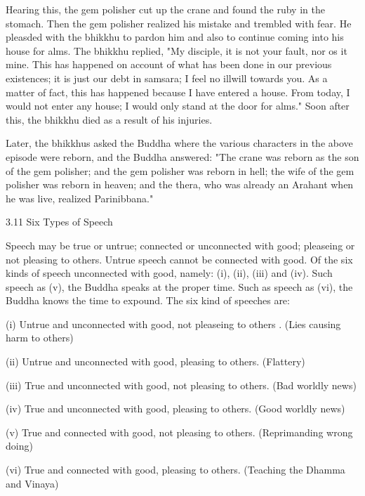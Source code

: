 Hearing this, the gem polisher cut up the crane and found the ruby in the stomach. Then the gem polisher realized his mistake and trembled with fear. He pleasded with the bhikkhu to pardon him and also to continue coming into his house for alms. The bhikkhu replied, "My disciple, it is not your fault, nor os it mine. This has happened on account of what has been done in our previous existences; it is just our debt in samsara; I feel no illwill towards you. As a matter of fact, this has happened because I have entered a house. From today, I would not enter any house; I would only stand at the door for alms." Soon after this, the bhikkhu died as a result of his injuries.

Later, the bhikkhus asked the Buddha where the various characters in the above episode were reborn, and the Buddha answered: "The crane was reborn as the son of the gem polisher; and the gem polisher was reborn in hell; the wife of the gem polisher was reborn in heaven; and the thera, who was already an Arahant when he was live, realized Parinibbana."

3.11 Six Types of Speech

Speech may be true or untrue; connected or unconnected with good; pleaseing or not pleasing to others. Untrue speech cannot be connected with good. Of the six kinds of speech unconnected with good, namely: (i), (ii), (iii) and (iv). Such speech as (v), the Buddha speaks at the proper time. Such as speech as (vi), the Buddha knows the time to expound. The six kind of speeches are:

(i) Untrue and unconnected with good, not pleaseing to others . (Lies causing harm to others)

(ii) Untrue and unconnected with good, pleasing to others. (Flattery)

(iii) True and unconnected with good, not pleasing to others. (Bad worldly news)

(iv) True and unconnected with good, pleasing to others. (Good worldly news)

(v) True and connected with good, not pleasing to others. (Reprimanding wrong doing)

(vi) True and connected with good, pleasing to others. (Teaching the Dhamma and Vinaya)
